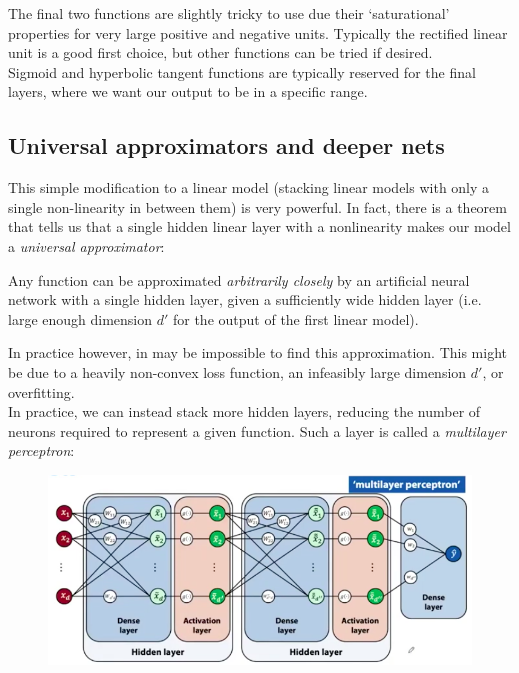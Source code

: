 The final two functions are slightly tricky to use due their `saturational' properties for very large positive and negative units. Typically the rectified linear unit is a good first choice, but other functions can be tried if desired.\\

Sigmoid and hyperbolic tangent functions are typically reserved for the final layers, where we want our output to be in a specific range. 





\newpage
\subsection{Universal approximators and deeper nets}
This simple modification to a linear model (stacking linear models with only a single non-linearity in between them) is very powerful. In fact, there is a theorem that tells us that a single hidden linear layer with a nonlinearity makes our model a \textit{universal approximator}:

\begin{frameprop}
Any function can be approximated \textit{arbitrarily closely} by an artificial neural network with a single hidden layer, given a sufficiently wide hidden layer (i.e. large enough dimension $d'$ for the output of the first linear model). 
\end{frameprop}

In practice however, in may be impossible to find this approximation. This might be due to a heavily non-convex loss function, an infeasibly large dimension $d'$, or overfitting.\\

In practice, we can instead stack more hidden layers, reducing the number of neurons required to represent a given function. Such a layer is called a \textit{multilayer perceptron}:
\begin{figure}[H]
\centering
\includegraphics[scale=0.4]{multilayerperceptron.png}
\end{figure}


